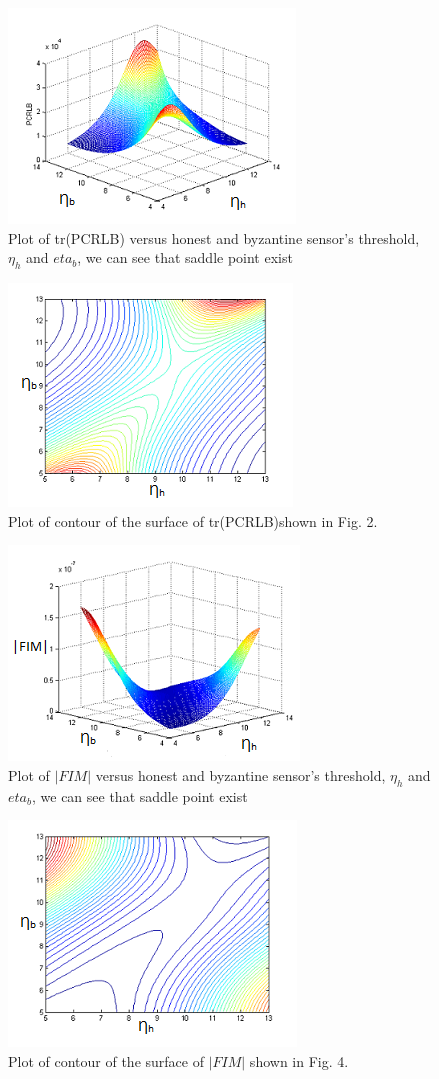 \documentclass[conference]{IEEEtran}
\begin{document}
\begin{figure} [H]
\centering
\includegraphics{mesh_pcrlb_trace.png}
\caption{Plot of tr(PCRLB) versus honest and byzantine sensor's threshold, $\eta_h$ and $eta_b$, we can see that saddle point exist }
\label{F3}

\end{figure}
\begin{figure} [H]
\centering
\includegraphics{contour_pcrlb_trace.png}
\caption{Plot of contour of the surface of tr(PCRLB)shown in Fig. 2.}
\label{F4}
\end{figure}

\begin{figure} [H]
\centering
\includegraphics{mesh_det_fim.png}
\caption{Plot of $|FIM|$ versus honest and byzantine sensor's threshold, $\eta_h$ and $eta_b$, we can see that saddle point exist}
\label{F5}
\end{figure}

\begin{figure} [H]
\centering
\includegraphics{contour_det_fim1.png}
\caption{Plot of contour of the surface of $|FIM|$ shown in Fig. 4.}
\label{F6}
\end{figure}
\end{document}
